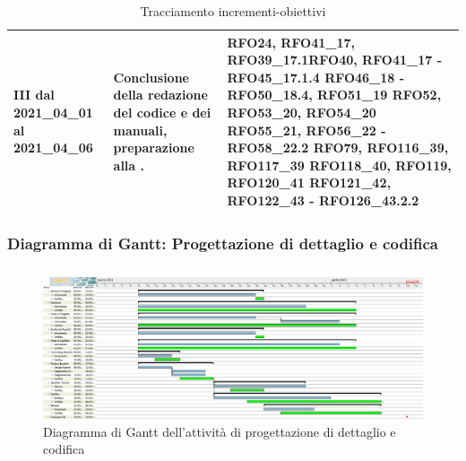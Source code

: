\begin{table}[H]
\begin{center}
\begin{tabular}{ |C{3cm} C{6cm} C{7cm}| }
			III dal 2021\_04\_01 al 2021\_04\_06 	& 
			Conclusione della redazione del codice e dei manuali, preparazione alla . & RFO24, RFO41\_17, RFO39\_17.1\newline RFO40,
			RFO41\_17 - RFO45\_17.1.4\newline
			RFO46\_18 - RFO50\_18.4, RFO51\_19 \newline
			RFO52, RFO53\_20, RFO54\_20 \newline
			RFO55\_21, RFO56\_22 - RFO58\_22.2 \newline
			RFO79, RFO116\_39, RFO117\_39 \newline RFO118\_40, RFO119, RFO120\_41 \newline
			RFO121\_42, RFO122\_43 - RFO126\_43.2.2 \\ \hline
		\end{tabular}
		\caption{Tracciamento incrementi-obiettivi}
	\end{center}
\end{table}

\newpage
\subsubsection{Diagramma di Gantt: Progettazione di dettaglio e codifica} \label{GanttPDettaglio}
\begin{figure}[ht]
    \centering
    \includegraphics[width=\textwidth]{Immagini/GanttProgettazioneDiDettaglioECodifica}
    \caption{Diagramma di Gantt dell'attività di progettazione di dettaglio e codifica}
\end{figure}